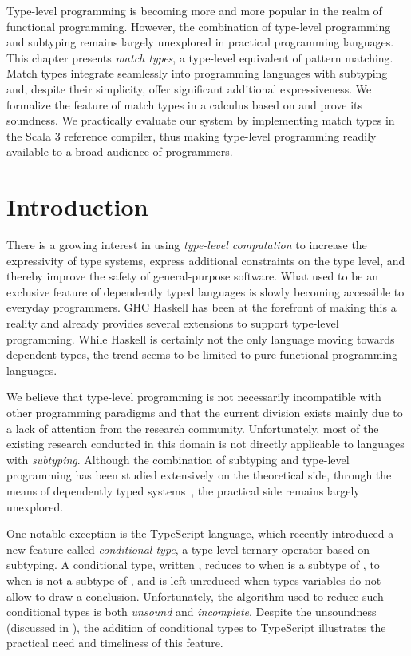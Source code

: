 Type-level programming is becoming more and more popular in the realm of functional programming.
However, the combination of type-level programming and subtyping remains largely unexplored in practical programming languages.
This chapter presents \emph{match types}, a type-level equivalent of pattern matching.
Match types integrate seamlessly into programming languages with subtyping and, despite their simplicity, offer significant additional expressiveness.
We formalize the feature of match types in a calculus based on \SystemFsub and prove its soundness.
We practically evaluate our system by implementing match types in the Scala 3 reference compiler, thus making type-level programming readily available to a broad audience of programmers.

\section{Introduction}
\label{sec:introduction}

There is a growing interest in using \emph{type-level computation} to increase the expressivity of type systems, express additional constraints on the type level, and thereby improve the safety of general-purpose software.
What used to be an exclusive feature of dependently typed languages is slowly becoming accessible to everyday programmers.
GHC Haskell has been at the forefront of making this a reality and already provides several extensions to support type-level programming.
While Haskell is certainly not the only language moving towards dependent types, the trend seems to be limited to pure functional programming languages.

We believe that type-level programming is not necessarily incompatible with other programming paradigms and that the current division exists mainly due to a lack of attention from the research community.
Unfortunately, most of the existing research conducted in this domain is not directly applicable to languages with \emph{subtyping}.
Although the combination of subtyping and type-level programming has been studied extensively on the theoretical side, through the means of dependently typed systems~\citep{aspinall1994singleton, zwanenburg1999pure, stone2000deciding, courant2003strong, hutchins2010pure, yang2017unifying}, the practical side remains largely unexplored.

One notable exception is the TypeScript language, which recently introduced a new feature called \emph{conditional type}, a type-level ternary operator based on subtyping.
A conditional type, written , reduces to  when  is a subtype of , to  when  is not a subtype of , and is left unreduced when types variables do not allow to draw a conclusion. Unfortunately, the algorithm used to reduce such conditional types is both \emph{unsound} and \emph{incomplete}.
Despite the unsoundness (discussed in ), the addition of conditional types to TypeScript illustrates the practical need and timeliness of this feature.

